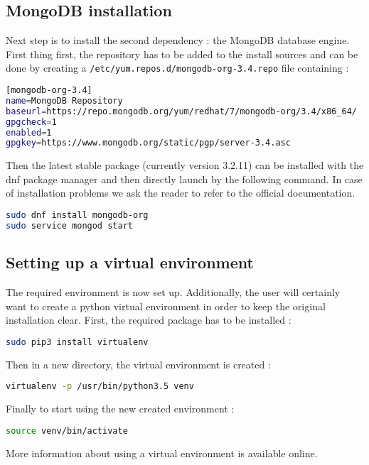 \subsection{MongoDB installation}

Next step is to install the second dependency : the MongoDB database engine. First thing first, the repository has to be added to the install sources and can be done by creating a \texttt{/etc/yum.repos.d/mongodb-org-3.4.repo} file containing :
\smallskip
\begin{lstlisting}[language=bash]
[mongodb-org-3.4]
name=MongoDB Repository
baseurl=https://repo.mongodb.org/yum/redhat/7/mongodb-org/3.4/x86_64/
gpgcheck=1
enabled=1
gpgkey=https://www.mongodb.org/static/pgp/server-3.4.asc
\end{lstlisting}

Then the latest stable package (currently version 3.2.11) can be installed with the dnf package manager and then directly launch by the following command. In case of installation problems we ask the reader to refer to the official documentation.
\smallskip
\begin{lstlisting}[language=bash]
sudo dnf install mongodb-org
sudo service mongod start
\end{lstlisting}

\subsection{Setting up a virtual environment}

The required environment is now set up. Additionally, the user will certainly want to create a python virtual environment in order to keep the original installation clear. First, the required package has to be installed :
\smallskip
\begin{lstlisting}[language=bash]
sudo pip3 install virtualenv
\end{lstlisting}

Then in a new directory, the virtual environment is created :
\smallskip
\begin{lstlisting}[language=bash]
virtualenv -p /usr/bin/python3.5 venv
\end{lstlisting}

Finally to start using the new created environment :
\smallskip
\begin{lstlisting}[language=bash]
source venv/bin/activate
\end{lstlisting}

More information about using a virtual environment is available online. \citep{venv}

